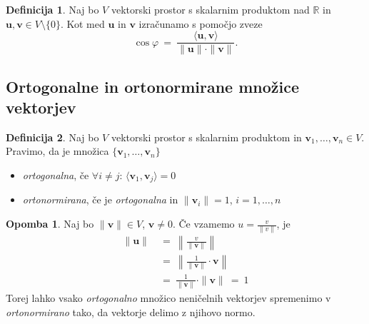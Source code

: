 \documentclass[11pt]{article}
\newcommand{\R}{\mathbb{R}}
\newcommand{\ls}{\langle}
\newcommand{\rs}{\rangle}
\renewcommand{\u}{\mathbf{u}}
\newcommand{\vv}{\mathbf{v}}
\newcommand{\0}{\mathbf{0}}
\theoremstyle{definition}
\newtheorem{definicija}{Definicija}[section]
\theoremstyle{definition}
\theoremstyle{definition}
\theoremstyle{definition}
\newtheorem*{opomba}{Opomba}
\begin{document}
\begin{definicija}

Naj bo $V$ vektorski prostor s skalarnim produktom nad $\R$ in $\u,\vv \in V \setminus \{0\}$. Kot med $\u$ in $\vv$ izračunamo s pomočjo zveze
$$\cos \varphi ~=~ \frac{\ls \u, \vv \rs}{\|\u\| \cdot \|\vv\|}.$$

\end{definicija}
\vspace{0.5cm}


\subsection{Ortogonalne in ortonormirane množice vektorjev}
\vspace{0.5cm}

\begin{definicija}

Naj bo $V$ vektorski prostor s skalarnim produktom in $\vv_1,\ldots,\vv_n \in V$. Pravimo, da je množica $\{\vv_1,\ldots,\vv_n\}$
\begin{itemize}
	\item \textit{ortogonalna}, če $\forall i \neq j$: $\ls \vv_1, \vv_j \rs = 0$
	\item \textit{ortonormirana}, če je \textit{ortogonalna} in $\|\vv_i\|=1$, $i = 1,\ldots,n$
\end{itemize}

\end{definicija}
\vspace{0.5cm}

\begin{opomba}

Naj bo $\|\vv\| \in V$, $\vv \neq 0$. Če vzamemo $u = \frac{v}{\|v\|}$, je
\begin{align*}
\|\u\| ~&=~ \left\lVert \frac{v}{\|\vv\|} \right\rVert \\
&=~ \left\lVert \frac{1}{\|\vv\|} \cdot \vv \right\rVert \\
&=~ \frac{1}{\|\vv\|} \cdot \|\vv\| ~=~ 1
\end{align*}
Torej lahko vsako \textit{ortogonalno} množico neničelnih vektorjev spremenimo v \textit{ortonormirano} tako, da vektorje delimo z njihovo normo.

\end{opomba}
\vspace{0.5cm}
\end{document}

